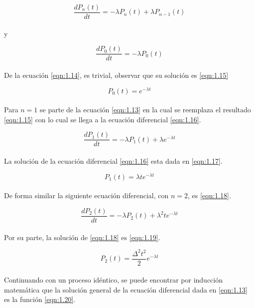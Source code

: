 \begin{equation}
    \frac{d P_{n}\left ( t \right )}{dt} = -\lambda P_{n}\left ( t \right )+\lambda P_{n-1}\left ( t \right )
    \label{eqn:1.13}
\end{equation}
\\
y 

\begin{equation}
    \frac{dP_{0}\left ( t \right )}{dt} = -\lambda P_{0}\left ( t \right )
    \label{eqn:1.14}
\end{equation}
\\
De la ecuación \ref{eqn:1.14}, es trivial, observar que su solución es \ref{eqn:1.15}

\begin{equation}
    P_{0}\left ( t \right )=e^{-\lambda t}
    \label{eqn:1.15}
\end{equation}
\\
Para $ n = 1 $ se parte de la ecuación \ref{eqn:1.13} en la cual se reemplaza el resultado \ref{eqn:1.15} con lo cual se llega a la ecuación diferencial \ref{eqn:1.16}.

\begin{equation}
    \frac{dP_{1}\left ( t \right )}{dt} = -\lambda P_{1}\left ( t \right )+\lambda e^{-\lambda t}
    \label{eqn:1.16}
\end{equation}
\\
La solución de la ecuación diferencial \ref{eqn:1.16} esta dada en \ref{eqn:1.17}.

\begin{equation}
    P_{1}\left ( t \right )=\lambda te^{-\lambda t}
    \label{eqn:1.17}
\end{equation}
\\
De forma similar la siguiente ecuación diferencial, con $ n = 2 $, es \ref{eqn:1.18}.

\begin{equation}
    \frac{dP_{2}\left ( t \right )}{dt} = - \lambda P_{2}\left ( t \right ) + \lambda^{2}te^{-\lambda t}
    \label{eqn:1.18}
\end{equation}
\\
Por su parte, la solución de \ref{eqn:1.18} es \ref{eqn:1.19}.

\begin{equation}
    P_{2}\left ( t \right )=\frac{\Delta ^{2}t^{2} }{2} e^{-\lambda t}
    \label{eqn:1.19}
\end{equation}
\\
Continuando con un proceso idéntico, se puede encontrar por inducción matemática que la solución general de la ecuación diferencial dada en \ref{eqn:1.13} es la función \ref{eqn:1.20}.


